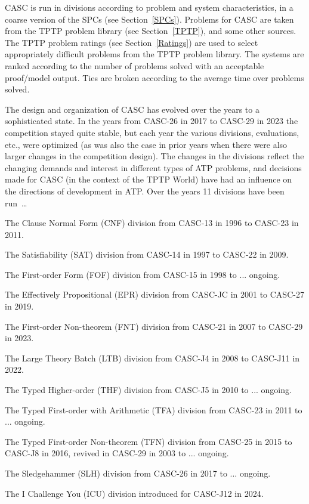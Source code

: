 \documentclass{easychair}
\newenvironment{packed_itemize}{
\vspace*{-0.2em}
\begin{itemize}
\setlength{\partopsep}{0pt}
\setlength{\itemsep}{1pt}
\setlength{\parskip}{0pt}
\setlength{\parsep}{0pt}
}{\end{itemize}}
\begin{document}
CASC is run in divisions according to problem and system characteristics, in a coarse version
of the SPCs (see Section~\ref{SPCs}).
Problems for CASC are taken from the TPTP problem library (see Section~\ref{TPTP}), and some 
other sources. 
The TPTP problem ratings (see Section~\ref{Ratings}) are used to select appropriately difficult
problems from the TPTP problem library.
The systems are ranked according to the number of problems solved with an acceptable proof/model 
output.
Ties are broken according to the average time over problems solved.

The design and organization of CASC has evolved over the years to a sophisticated state.
In the years from CASC-26 in 2017 to CASC-29 in 2023 the competition stayed quite stable, but 
each year the various divisions, evaluations, etc., were optimized (as was also the case in 
prior years when there were also larger changes in the competition design).
The changes in the divisions reflect the changing demands and interest in different types
of ATP problems, and decisions made for CASC (in the context of the TPTP World) have had an 
influence on the directions of development in ATP.
Over the years 11 divisions have been run~\ldots
\begin{packed_itemize}
\item The Clause Normal Form (CNF) division from CASC-13 in 1996 to CASC-23 in 2011.
\item The Satisfiability (SAT) division from CASC-14 in 1997 to CASC-22 in 2009.
\item The First-order Form (FOF) division from CASC-15 in 1998 to ... ongoing.
\item The Effectively Propositional (EPR) division from CASC-JC in 2001 to CASC-27 in 2019.
\item The First-order Non-theorem (FNT) division from CASC-21 in 2007 to CASC-29 in 2023.
\item The Large Theory Batch (LTB) division from CASC-J4 in 2008 to CASC-J11 in 2022.
\item The Typed Higher-order (THF) division from CASC-J5 in 2010 to ... ongoing.
\item The Typed First-order with Arithmetic (TFA) division from CASC-23 in 2011 to ... ongoing.
\item The Typed First-order Non-theorem (TFN) division from CASC-25 in 2015 to CASC-J8 in 2016,
      revived in CASC-29 in 2003 to ... ongoing.
\item The Sledgehammer (SLH) division from CASC-26 in 2017 to ... ongoing.
\item The I Challenge You (ICU) division introduced for CASC-J12 in 2024.
\end{packed_itemize}
\end{document}
